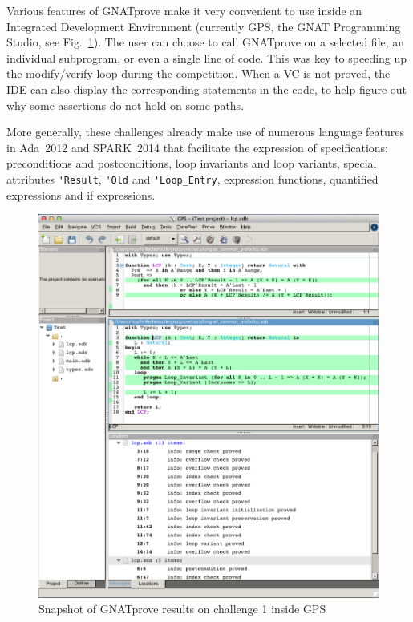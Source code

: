 \documentclass[sttt,final]{svjour}
\newcommand{\gnatprove}{GNATprove\xspace}
\newcommand{\newspark}{SPARK~2014\xspace}
\newcommand{\adatwtw}{Ada~2012\xspace}
\begin{document}
Various features of \gnatprove make it very convenient to use inside
an Integrated Development Environment (currently GPS, the GNAT
Programming Studio, see Fig.~\ref{fig:snapshot}). The user can choose
to call \gnatprove on a selected file, an individual subprogram, or
even a single line of code. This was key to speeding up the
modify/verify loop during the competition. When a VC is not proved,
the IDE can also display the corresponding statements in the code, to
help figure out why some assertions do not hold on some paths.

More generally, these challenges already make use of numerous
language features in \adatwtw and \newspark that facilitate the
expression of specifications: preconditions and postconditions, loop
invariants and loop variants, special attributes \verb|'Result|,
\verb|'Old| and \verb|'Loop_Entry|, expression functions, quantified
expressions and if expressions.

\begin{figure}
\includegraphics[width=\linewidth]{gnatprove.png}
\caption{Snapshot of GNATprove results on challenge 1 inside GPS}
\label{fig:snapshot}
\end{figure}
\end{document}
